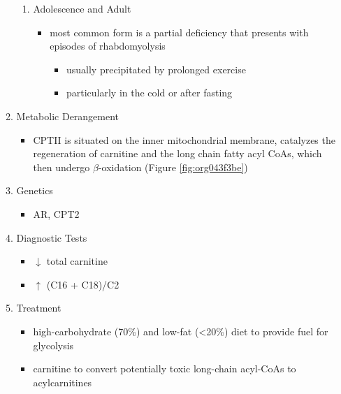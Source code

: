 \documentclass{scrartcl}
\begin{document}
\begin{enumerate}
\begin{enumerate}
\begin{enumerate}
\item Adolescence and Adult
\label{sec:org7292465}
\begin{itemize}
\item most common form is a partial deficiency that presents with
episodes of rhabdomyolysis
\begin{itemize}
\item usually precipitated by prolonged exercise
\item particularly in the cold or after fasting
\end{itemize}
\end{itemize}
\end{enumerate}

\item Metabolic Derangement
\label{sec:org4477d39}
\begin{itemize}
\item CPTII is situated on the inner mitochondrial membrane, catalyzes the
regeneration of carnitine and the long chain fatty acyl CoAs, which
then undergo \(\beta\)-oxidation (Figure \ref{fig:org043f3be})
\end{itemize}
\item Genetics
\label{sec:org918b9ea}
\begin{itemize}
\item AR, CPT2
\end{itemize}
\item Diagnostic Tests
\label{sec:orga191107}
\begin{itemize}
\item \(\downarrow\) total carnitine
\item \(\uparrow\) (C16 + C18)/C2
\end{itemize}

\item Treatment
\label{sec:orgfc95bee}
\begin{itemize}
\item high-carbohydrate (70\%) and low-fat (<20\%) diet to provide fuel for glycolysis
\item carnitine to convert potentially toxic long-chain acyl-CoAs to
acylcarnitines
\end{itemize}
\end{enumerate}
\end{enumerate}
\end{document}
